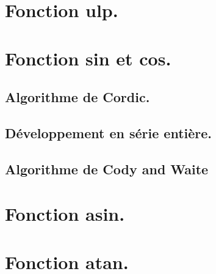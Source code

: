 \documentclass[a4,12pt]{article}
\begin{document}
\section{Fonction ulp.}
\section{Fonction sin et cos.}
\subsection{Algorithme de Cordic.}
\subsection{Développement en série entière.}
\subsection{Algorithme de Cody and Waite}
\section{Fonction asin.}
\section{Fonction atan.}
\end{document}
